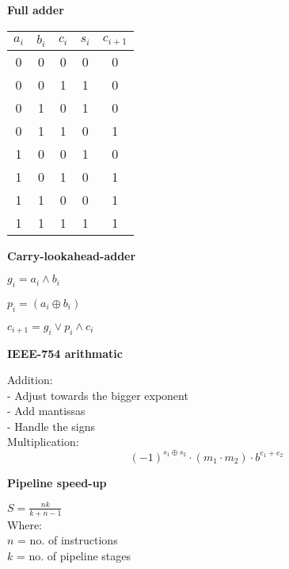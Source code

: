 \documentclass[10pt,fleqn, a4paper]{article}
\begin{document}
\begin{minipage}[t]{0.5\textwidth}

{\bf Full adder}\newline

\begin{tabular}{ccc|cc}
$a_i$ & $b_i$ & $c_i$ & $s_i$ & $c_{i+1}$\\\hline
0&0&0&0&0\\
0&0&1&1&0\\
0&1&0&1&0\\
0&1&1&0&1\\
1&0&0&1&0\\
1&0&1&0&1\\
1&1&0&0&1\\
1&1&1&1&1
\end{tabular}
\end{minipage}
\begin{minipage}[t]{0.5\textwidth}
{\bf Carry-lookahead-adder}\newline

$g_i = a_i\wedge b_i$

$p_i = (a_i\oplus b_i)$

$c_{i+1} = g_i\vee p_i\wedge c_i$
\end{minipage}

\vspace*{1cm}

\begin{minipage}[t]{0.5\textwidth}
{\bf IEEE-754 arithmatic}\newline

Addition:\\
- Adjust towards the bigger exponent\\
- Add mantissas\\
- Handle the signs\\

Multiplication:
$$(-1)^{s_1\oplus s_2}\cdot (m_1\cdot m_2)\cdot b^{e_1+e_2}$$

\end{minipage}
\begin{minipage}[t]{0.5\textwidth}
{\bf Pipeline speed-up}\newline

$S=\displaystyle\frac{nk}{k+n-1}$\\

Where:\\
$n$ = no. of instructions\\
$k$ = no. of pipeline stages
\end{minipage}
\end{document}
